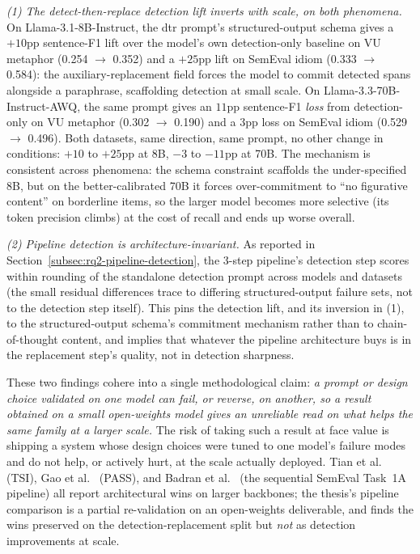 \textit{(1) The detect-then-replace detection lift inverts with scale, on both phenomena.} On Llama-3.1-8B-Instruct, the dtr prompt's structured-output schema gives a $+10$pp sentence-F1 lift over the model's own detection-only baseline on VU metaphor (0.254 $\to$ 0.352) and a $+25$pp lift on SemEval idiom (0.333 $\to$ 0.584): the auxiliary-replacement field forces the model to commit detected spans alongside a paraphrase, scaffolding detection at small scale. On Llama-3.3-70B-Instruct-AWQ, the same prompt gives an $11$pp sentence-F1 \textit{loss} from detection-only on VU metaphor (0.302 $\to$ 0.190) and a $3$pp loss on SemEval idiom (0.529 $\to$ 0.496). Both datasets, same direction, same prompt, no other change in conditions: $+10$ to $+25$pp at 8B, $-3$ to $-11$pp at 70B. The mechanism is consistent across phenomena: the schema constraint scaffolds the under-specified 8B, but on the better-calibrated 70B it forces over-commitment to ``no figurative content'' on borderline items, so the larger model becomes more selective (its token precision climbs) at the cost of recall and ends up worse overall.

\textit{(2) Pipeline detection is architecture-invariant.} As reported in Section~\ref{subsec:rq2-pipeline-detection}, the 3-step pipeline's detection step scores within rounding of the standalone detection prompt across models and datasets (the small residual differences trace to differing structured-output failure sets, not to the detection step itself). This pins the detection lift, and its inversion in (1), to the structured-output schema's commitment mechanism rather than to chain-of-thought content, and implies that whatever the pipeline architecture buys is in the replacement step's quality, not in detection sharpness.

These two findings cohere into a single methodological claim: \emph{a prompt or design choice validated on one model can fail, or reverse, on another, so a result obtained on a small open-weights model gives an unreliable read on what helps the same family at a larger scale.} The risk of taking such a result at face value is shipping a system whose design choices were tuned to one model's failure modes and do not help, or actively hurt, at the scale actually deployed. Tian et al.~\cite{Tian2024} (TSI), Gao et al.~\cite{Gao2025} (PASS), and Badran et al.~\cite{Badran2025} (the sequential SemEval Task~1A pipeline) all report architectural wins on larger backbones; the thesis's pipeline comparison is a partial re-validation on an open-weights deliverable, and finds the wins preserved on the detection-replacement split but \textit{not} as detection improvements at scale.

